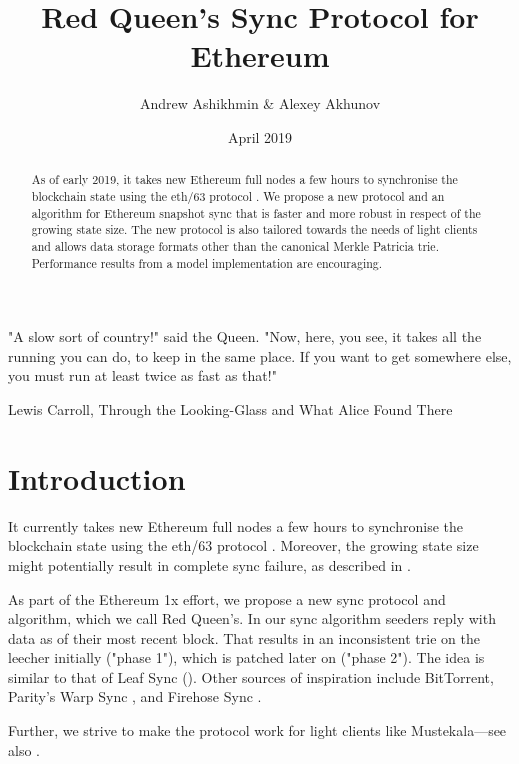 \documentclass{amsart}
\begin{document}
\pagecolor{white}

\title{Red Queen's Sync Protocol for Ethereum}
\author{Andrew Ashikhmin \& Alexey Akhunov}
\date{April 2019}

\begin{abstract}
    As of early 2019, it takes new Ethereum full nodes a few hours
    to synchronise the blockchain state using the eth/63 protocol \cite{wire_protocol}.
    We propose a new protocol and an algorithm for Ethereum snapshot sync
    that is faster and more robust in respect of the growing state size.
    The new protocol is also tailored towards the needs of light clients
    and allows data storage formats other than the canonical Merkle Patricia trie.
    Performance results from a model implementation are encouraging.
\end{abstract}

\maketitle

\epigraph{
    "A slow sort of country!" said the Queen.
    "Now, here, you see, it takes all the running you can do, to keep in the same place.
    If you want to get somewhere else, you must run at least twice as fast as that!"
    }{Lewis Carroll, Through the Looking-Glass and What Alice Found There}

\section{Introduction}

It currently takes new Ethereum full nodes a few hours
to synchronise the blockchain state using the eth/63 protocol \cite{wire_protocol}.
Moreover, the growing state size might potentially result in complete sync failure,
as described in \cite{akhunov_1x_workshop_part1}.

As part of the Ethereum 1x effort, we propose a new sync protocol and algorithm,
which we call Red Queen's.
In our sync algorithm seeders reply with data as of their most recent block.
That results in an inconsistent trie on the leecher initially ("phase 1"),
which is patched later on ("phase 2").
The idea is similar to that of Leaf Sync (\cite{leaf_sync}).
Other sources of inspiration include BitTorrent, Parity's Warp Sync \cite{warp_sync}, and Firehose Sync \cite{firehose}.

Further, we strive to make the protocol work for light clients like Mustekala---see also \cite{light_client_protocol}.
\end{document}

